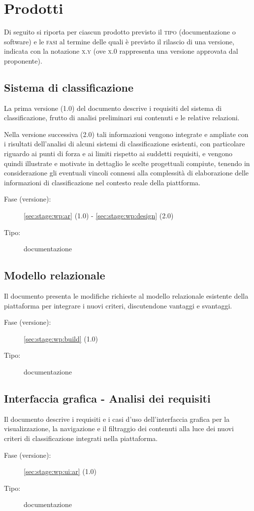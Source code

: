 \documentclass[10pt,a4paper,hidelinks]{scrartcl} %
\begin{document}
	\newpage
	\section{Prodotti}
	Di seguito si riporta per ciascun prodotto previsto il \textsc{tipo} (documentazione o software) e le \textsc{fasi} al termine delle quali è previsto il rilascio di una versione, indicata con la notazione \textsc{x.y} (ove \textsc{x.0} rappresenta una versione approvata dal proponente).

	\subsection{Sistema di classificazione}
	\label{sec:stage:prod:sc}
	La prima versione (1.0) del documento descrive i requisiti del sistema di classificazione, frutto di analisi preliminari sui contenuti e le relative relazioni.

	Nella versione successiva (2.0) tali informazioni vengono integrate e ampliate con i risultati dell'analisi di alcuni sistemi di classificazione esistenti, con particolare riguardo ai punti di forza e ai limiti rispetto ai suddetti requisiti, e vengono quindi illustrate e motivate in dettaglio le scelte progettuali compiute, tenendo in considerazione gli eventuali vincoli connessi alla complessità di elaborazione delle informazioni di classificazione nel contesto reale della piattforma.
	\begin{description}
	\item[Fase (versione):] \ref{sec:stage:wp:ar} (1.0) - \ref{sec:stage:wp:design} (2.0)
	\item[Tipo:] documentazione
	\end{description}

	\subsection{Modello relazionale}
	Il documento presenta le modifiche richieste al modello relazionale esistente della piattaforma per integrare i nuovi criteri, discutendone vantaggi e svantaggi.
	\label{sec:stage:prod:mr}
	\begin{description}
	\item[Fase (versione):] \ref{sec:stage:wp:build} (1.0)
	\item[Tipo:] documentazione
	\end{description}

	\subsection{Interfaccia grafica - Analisi dei requisiti}
	Il documento descrive i requisiti e i casi d'uso dell'interfaccia grafica per la visualizzazione, la navigazione e il filtraggio dei contenuti alla luce dei nuovi criteri di classificazione integrati nella piattaforma.
	\label{sec:stage:prod:ui:ar}
	\begin{description}
	\item[Fase (versione):] \ref{sec:stage:wp:ui:ar} (1.0)
	\item[Tipo:] documentazione
	\end{description}
\end{document}
